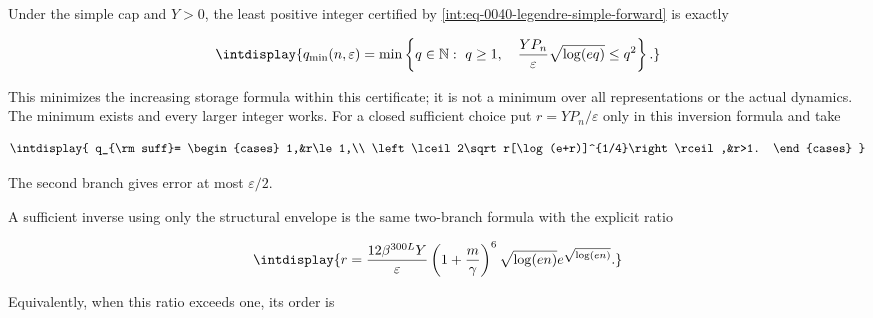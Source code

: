
Under the simple cap and \(Y>0\), the least positive integer certified by \eqref{int:eq-0040-legendre-simple-forward} is exactly


\begingroup\renewcommand{\theHequation}{intdisplay.137}
\begin{equation}
\intdisplay{
q_{\min}(n,\varepsilon)=
\min\left\{q\in\mathbb N:\ q\ge1,\quad
\frac{YP_n}{\varepsilon}\sqrt{\log(eq)}\le q^2\right\}.
}
\label{int:eq-0046-legendre-simple-inverse}
\end{equation}
\endgroup


This minimizes the increasing storage formula within this certificate; it is not a minimum over all representations or the actual dynamics. The minimum exists and every larger integer works. For a closed sufficient choice put \(r=YP_n/\varepsilon\) only in this inversion formula and take


\begingroup\renewcommand{\theHequation}{intdisplay.138}
\begin{equation}
\intdisplay{
q_{\rm suff}=
\begin{cases}
1,&r\le1,\\
\left\lceil2\sqrt r[\log(e+r)]^{1/4}\right\rceil,&r>1.
\end{cases}
}
\label{int:eq-0047-legendre-simple-sufficient-order}
\end{equation}
\endgroup


The second branch gives error at most \(\varepsilon/2\).



A sufficient inverse using only the structural envelope is the same two-branch formula with the explicit ratio


\begingroup\renewcommand{\theHequation}{intdisplay.139}
\begin{equation}
\intdisplay{
r=\frac{12\beta^{300L}Y}{\varepsilon}
\left(1+\frac m\gamma\right)^6
\sqrt{\log(en)}e^{\sqrt{\log(en)}}.
}
\label{int:eq-0048-legendre-structural-inverse-ratio}
\end{equation}
\endgroup


Equivalently, when this ratio exceeds one, its order is



